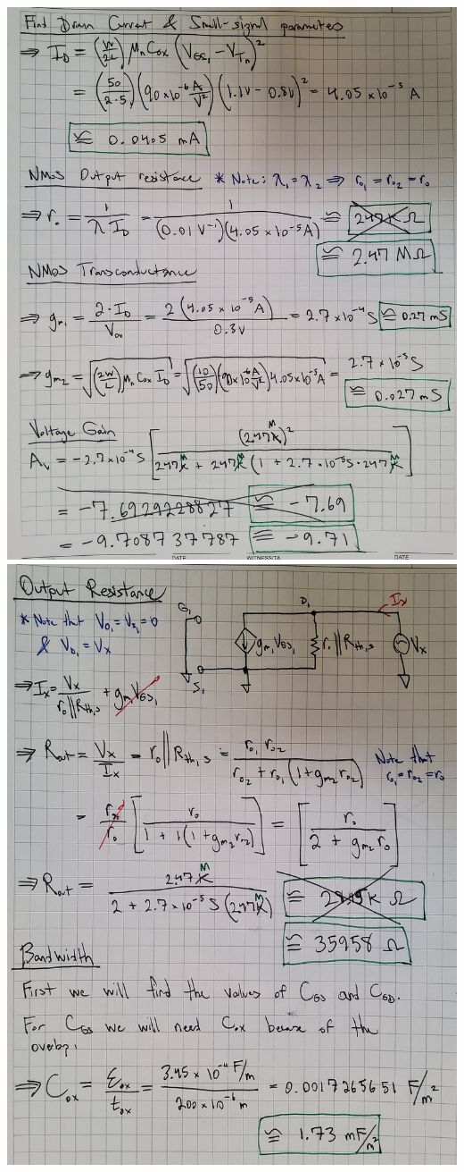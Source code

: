 \documentclass[12pt, fleqn]{article}
\begin{document}
\includegraphics[scale=0.175, angle=90, center]{p1_2.jpg}\\
\newpage
\includegraphics[scale=0.15, angle=90, center]{p1_3.jpg}\\
\end{document}
